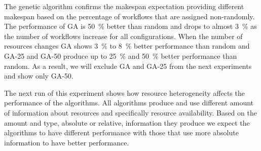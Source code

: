 The genetic algorithm confirms the makespan expectation providing different makespan based on the percentage of workflows that are assigned non-randomly.
The performance of GA is 50~\% better than random and drops to almost 3~\% as the number of workflows increase for all configurations.
When the number of resources changes GA shows 3~\% to 8~\% better performance than random and GA-25 and GA-50 produce up to 25~\% and 50~\% better performance than random.
As a result, we will exclude GA and GA-25 from the next experiments and show only GA-50.

The next run of this experiment shows how resource heterogeneity affects the performance of the algorithms.
All algorithms produce and use different amount of information about resources and specifically resource availability.
Based on the amount and type, absolute or relative, information they produce we expect the algorithms to have different performance with those that use more absolute information to have better performance.


